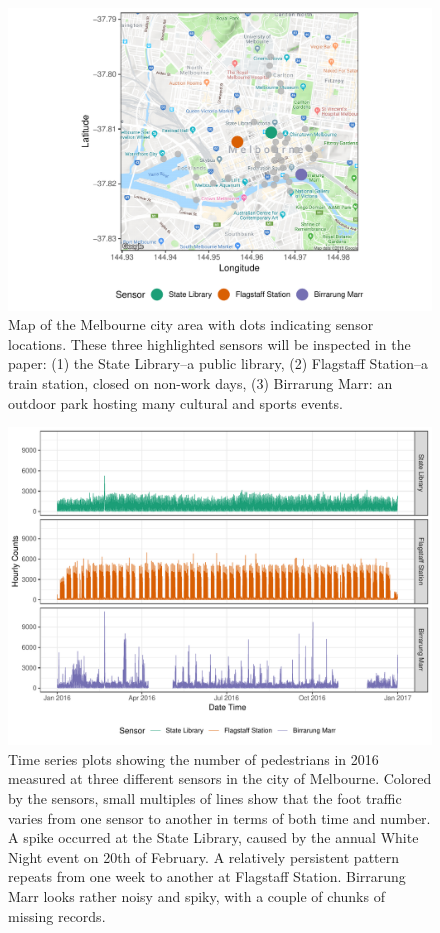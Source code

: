\documentclass[12pt]{article}
\begin{document}
\begin{figure}

{\centering \includegraphics[width=0.7\linewidth]{figure/ped-map-1} 

}

\caption{Map of the Melbourne city area with dots indicating sensor locations. These three highlighted sensors will be inspected in the paper: (1) the State Library--a public library, (2) Flagstaff Station--a train station, closed on non-work days, (3) Birrarung Marr: an outdoor park hosting many cultural and sports events.}\label{fig:ped-map}
\end{figure}

\begin{figure}

{\centering \includegraphics[width=\textwidth]{figure/time-series-plot-1} 

}

\caption{Time series plots showing the number of pedestrians in 2016 measured at three different sensors in the city of Melbourne. Colored by the sensors, small multiples of lines show that the foot traffic varies from one sensor to another in terms of both time and number. A spike occurred at the State Library, caused by the annual White Night event on 20th of February. A relatively persistent pattern repeats from one week to another at Flagstaff Station. Birrarung Marr looks rather noisy and spiky, with a couple of chunks of missing records.}\label{fig:time-series-plot}
\end{figure}
\end{document}
